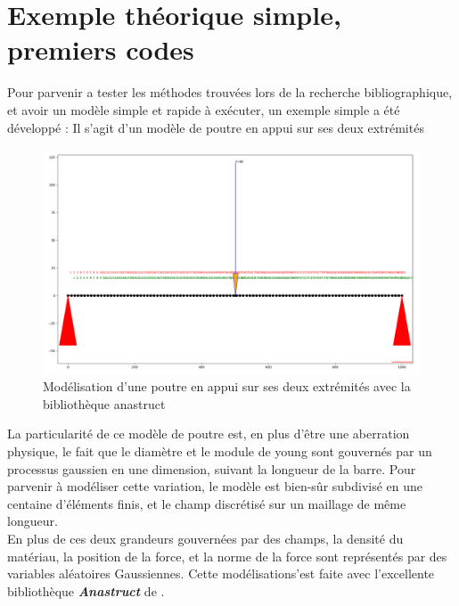 \documentclass[a4paper,10pt]{article}
\begin{document}
\section{Exemple théorique simple, premiers codes}
Pour parvenir a tester les méthodes trouvées lors de la recherche bibliographique, et avoir un modèle simple et rapide à exécuter, un exemple simple a été développé : 
Il s'agit d'un modèle de poutre en appui sur ses deux extrémités
\begin{figure}[H]
   \centering   
   \includegraphics[scale=0.20]{beam_structure.png}
      \caption{Modélisation d'une poutre en appui sur ses deux extrémités avec la bibliothèque anastruct}
         \label{fig:nonfloat}
\end{figure}

La particularité de ce modèle de poutre est, en plus d'être une aberration physique, le fait que le diamètre et le module de young sont gouvernés par un processus gaussien en une dimension, suivant la longueur de la barre. Pour parvenir à modéliser cette variation, le modèle est bien-sûr subdivisé en une centaine d'éléments finis, et le champ discrétisé sur un maillage de même longueur.\\
En plus de ces deux grandeurs gouvernées par des champs, la densité du matériau, la position de la force, et la norme de la force sont représentés par des variables aléatoires Gaussiennes. Cette modélisations'est faite avec l'excellente bibliothèque \textbf{\textit{Anastruct}} de \cite{Vink2020Feb}.
\end{document}
